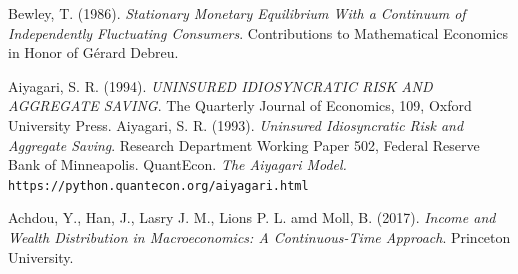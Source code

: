 \documentclass[12pt]{article}
\begin{document}
\begin{thebibliography}{99}
 {\sc Bewley, T.} (1986).  \textit{Stationary Monetary Equilibrium With a Continuum of Independently Fluctuating Consumers}. Contributions to Mathematical Economics in Honor of Gérard Debreu.

 {\sc Aiyagari, S. R.} (1994). \textit{UNINSURED IDIOSYNCRATIC RISK AND AGGREGATE SAVING}. The Quarterly Journal of Economics, 109, Oxford University Press.
 {\sc Aiyagari, S. R.} (1993). \textit{Uninsured Idiosyncratic Risk and Aggregate Saving}. Research Department Working Paper 502, Federal Reserve Bank of Minneapolis.
 {\sc QuantEcon.}  \textit{The Aiyagari Model.} \texttt{https://python.quantecon.org/aiyagari.html}

 {\sc Achdou, Y.}, {\sc Han, J.}, {\sc Lasry J. M.}, {\sc Lions P. L.} amd {\sc Moll, B.} (2017). \textit{Income and Wealth Distribution in Macroeconomics: A Continuous-Time Approach}. Princeton University.
\end{thebibliography}
\end{document}
